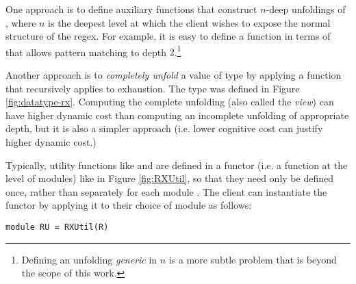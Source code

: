 One approach is to define auxiliary functions that construct $n$-deep unfoldings of , where $n$ is the deepest level at which the client wishes to expose the normal structure of the regex. For example, it is easy to define a function  in terms of  that allows pattern matching to depth $2$.\footnote{Defining an unfolding \emph{generic} in $n$ is a more subtle problem that is beyond the scope of this work.} 

Another approach is to \emph{completely unfold} a value of type  by applying a function  that recursively applies  to exhaustion. The type  was defined in Figure \ref{fig:datatype-rx}.  Computing the complete unfolding (also called the \emph{view}) can have higher dynamic cost than computing an incomplete unfolding of appropriate depth, but it is also a simpler approach (i.e.   lower cognitive cost can justify higher dynamic cost.)

Typically, utility functions like  and  are defined in a functor (i.e. a function at the level of modules) like  in Figure \ref{fig:RXUtil}, so that they need only be defined once, rather than separately for each module . The client can instantiate the functor by applying it to their choice of module as follows:
\begin{lstlisting}[numbers=none]
module RU = RXUtil(R)
\end{lstlisting}

